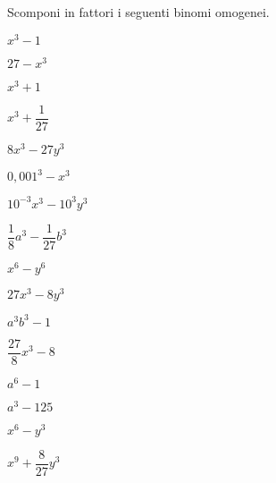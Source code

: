 \begin{esercizio}
\label{ese:17.16}
 Scomponi in fattori i seguenti binomi omogenei.
 \begin{multicols}{4}
 \begin{enumeratea}
 \item \(x^{3}-1\)
 \item \(27-x^{3}\)
 \item \(x^{3}+1\)
 \item \(x^{3}+\dfrac{1}{27}\)
 \item \(8x^{3}-27y^{3}\)
 \item \(0,001^{3}-x^{3}\)
 \item \(10^{-3}x^{3}-10^{3}y^{3}\)
 \item \(\dfrac{1}{8}a^{3}-\dfrac{1}{27}b^{3}\)
 \item \(x^{6}-y^{6}\)
 \item \(27x^{3}-8y^{3}\)
 \item \(a^{3}b^{3}-1\)
 \item \(\dfrac{27}{8}x^{3}-8\)
 \item \(a^{6}-1\)
 \item \(a^{3}-125\)
 \item \(x^{6}-y^{3}\)
 \item \(x^{9}+\dfrac{8}{27}y^{3}\)
 \end{enumeratea}
 \end{multicols}
\end{esercizio}


